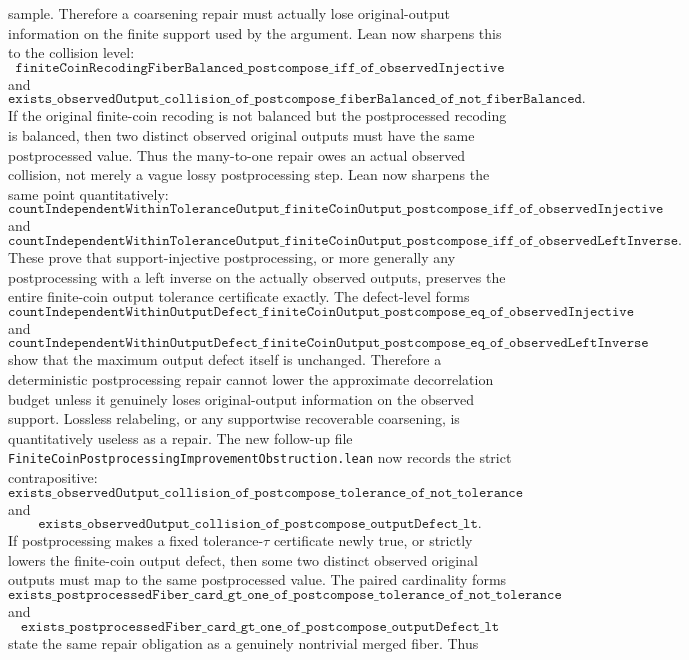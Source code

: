 \documentclass[11pt]{article}
\theoremstyle{remark}
\begin{document}
sample.  Therefore a coarsening repair must actually lose original-output
information on the finite support used by the argument.  Lean now sharpens this
to the collision level:
\[
  \texttt{finiteCoinRecodingFiberBalanced\_postcompose\_iff\_of\_observedInjective}
\]
and
\[
  \texttt{exists\_observedOutput\_collision\_of\_postcompose\_fiberBalanced\_of\_not\_fiberBalanced}.
\]
If the original finite-coin recoding is not balanced but the postprocessed
recoding is balanced, then two distinct observed original outputs must have the
same postprocessed value.  Thus the many-to-one repair owes an actual observed
collision, not merely a vague lossy postprocessing step.  Lean now sharpens
the same point quantitatively:
\[
  \texttt{countIndependentWithinToleranceOutput\_finiteCoinOutput\_postcompose\_iff\_of\_observedInjective}
\]
and
\[
  \texttt{countIndependentWithinToleranceOutput\_finiteCoinOutput\_postcompose\_iff\_of\_observedLeftInverse}.
\]
These prove that support-injective postprocessing, or more generally any
postprocessing with a left inverse on the actually observed outputs, preserves
the entire finite-coin output tolerance certificate exactly.  The defect-level
forms
\[
  \texttt{countIndependentWithinOutputDefect\_finiteCoinOutput\_postcompose\_eq\_of\_observedInjective}
\]
and
\[
  \texttt{countIndependentWithinOutputDefect\_finiteCoinOutput\_postcompose\_eq\_of\_observedLeftInverse}
\]
show that the maximum output defect itself is unchanged.  Therefore a
deterministic postprocessing repair cannot lower the approximate
decorrelation budget unless it genuinely loses original-output information on
the observed support.  Lossless relabeling, or any supportwise recoverable
coarsening, is quantitatively useless as a repair.  The new follow-up file
\texttt{FiniteCoinPostprocessingImprovementObstruction.lean} now records the
strict contrapositive:
\[
  \texttt{exists\_observedOutput\_collision\_of\_postcompose\_tolerance\_of\_not\_tolerance}
\]
and
\[
  \texttt{exists\_observedOutput\_collision\_of\_postcompose\_outputDefect\_lt}.
\]
If postprocessing makes a fixed tolerance-\(\tau\) certificate newly true, or
strictly lowers the finite-coin output defect, then some two distinct observed
original outputs must map to the same postprocessed value.  The paired
cardinality forms
\[
  \texttt{exists\_postprocessedFiber\_card\_gt\_one\_of\_postcompose\_tolerance\_of\_not\_tolerance}
\]
and
\[
  \texttt{exists\_postprocessedFiber\_card\_gt\_one\_of\_postcompose\_outputDefect\_lt}
\]
state the same repair obligation as a genuinely nontrivial merged fiber.  Thus
\end{document}
